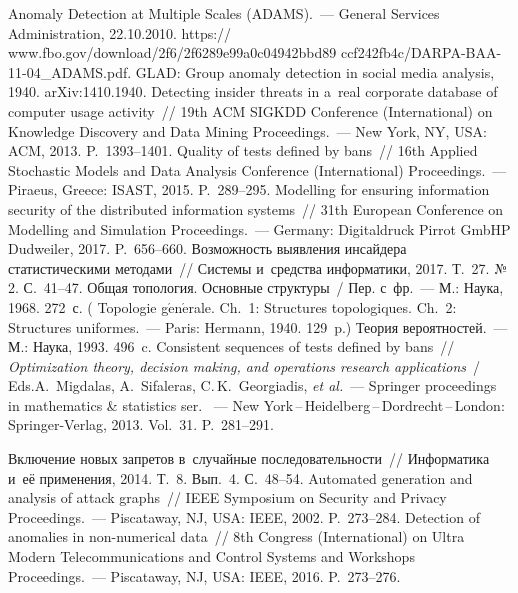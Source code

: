 \begin{multicols}{2}
{\small\frenchspacing
 {%
 \begin{thebibliography}{99}
     Anomaly Detection at Multiple Scales (ADAMS).~--- General Services Administration,  
22.10.2010. 
{\sf   
https:// www.fbo.gov/download/2f6/2f6289e99a0c04942bbd89 ccf242fb4c/DARPA-BAA-11-04\_ADAMS.pdf}.
     GLAD: Group anomaly detection in social media analysis, 1940.
 {\sf \mbox{arXiv}:1410.1940}.
      Detecting insider threats in a~real corporate 
database of computer usage activity~// 19th ACM SIGKDD Conference (International) on 
Knowledge Discovery and Data Mining Proceedings.~--- New York, NY, USA: ACM, 2013. 
P.~1393--1401.
 Quality of tests defined by bans~// 16th Applied 
Stochastic Models and Data Analysis Conference (International) Proceedings.~--- 
Piraeus, Greece: ISAST, 2015. P.~289--295.
      Modelling for ensuring information security of 
the distributed information systems~// 31th European Conference on Modelling and Simulation 
 Proceedings.~--- Germany: Digitaldruck Pirrot GmbHP Dudweiler, 2017.  
P.~656--660.
      Возможность выявления инсайдера статистическими 
методами~// Системы и~средства информатики, 2017. Т.~27. №\,2. С.~41--47.
      Общая топология. Основные структуры~/ Пер. с~фр.~--- М.: Наука, 
1968. 272~с. ( Topologie g$\acute{\mbox{e}}$n$\acute{\mbox{e}}$rale. Ch.~1: 
Structures topologiques. Ch.~2: Structures uniformes.~--- Paris: Hermann, 1940. 129~p.)
      Теория вероятностей.~--- М.: Наука, 1993. 496~c.
  Consistent sequences of tests defined by bans~// 
\textit{Optimization theory, decision making, and operations research applications}~/
Eds.\linebreak A.~Mig\-da\-las, A.~Sifaleras, C.\,K.~Georgiadis,
\textit{et al.}~--- Springer 
proceedings in mathematics \& statistics ser. ~---  
New York\,--\,Heidelberg\,--\,Dordrecht\,--\,London: Springer-Verlag,
2013.  Vol.~31. P.~281--291. 
     
     
      Включение новых запретов 
в~случайные последовательности~// Информатика и~её применения, 2014. Т.~8. Вып.~4. 
С.~48--54. 
      Automated generation and 
analysis of attack graphs~// IEEE Symposium on Security and Privacy Proceedings.~--- 
Piscataway, NJ, USA: IEEE, 2002. P.~273--284. 
      Detection of anomalies in non-numerical data~// 
8th Congress (International) on Ultra Modern Telecommunications and Control Systems and 
Workshops Proceedings.~--- Piscataway, NJ, USA: IEEE, 2016. P.~273--276.
     

\end{thebibliography}}}
\end{multicols}
